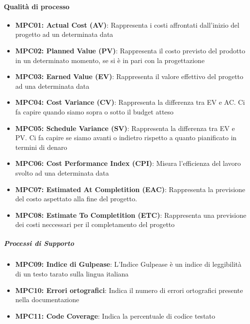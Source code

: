 \documentclass[12pt]{article}
\begin{document}
\paragraph{Qualità di processo}
\begin{itemize}
\item \textbf{MPC01: Actual Cost (AV)}: Rappresenta i costi affrontati dall'inizio del progetto ad un determinata data
  
\item \textbf{MPC02: Planned Value (PV)}:  Rappresenta il costo previsto del prodotto in un determinato momento, se si è in pari con la progettazione
      
\item \textbf{MPC03: Earned Value (EV)}:  Rappresenta il valore effettivo del progetto ad una determinata data
      
\item \textbf{MPC04: Cost Variance (CV)}:  Rappresenta la differenza tra EV e AC. Ci fa capire quando siamo sopra o sotto il budget atteso
      
\item \textbf{MPC05: Schedule Variance (SV)}:  Rappresenta la differenza tra EV e PV. Ci fa capire se siamo avanti o indietro rispetto a quanto pianificato in termini di denaro
      
\item \textbf{MPC06: Cost Performance Index (CPI)}: Misura l'efficienza del lavoro svolto ad una determinata data
      
\item \textbf{MPC07: Estimated At Completition (EAC)}: Rappresenta la previsione del costo aspettato alla fine del progetto.
      
\item \textbf{MPC08: Estimate To Completition (ETC)}: Rappresenta una previsione dei costi neccessari per il completamento del progetto
\end{itemize}

\subparagraph{Processi di Supporto} 

\begin{itemize}
\item \textbf{MPC09: Indice di Gulpease}: L'Indice Gulpease è un indice di leggibilità di un testo tarato sulla lingua italiana
	  
\item \textbf{MPC10: Errori ortografici}: Indica il numero di errori ortografici presente nella documentazione
	  
\item \textbf{MPC11: Code Coverage}: Indica la percentuale di codice testato

\end{itemize}
\end{document}
